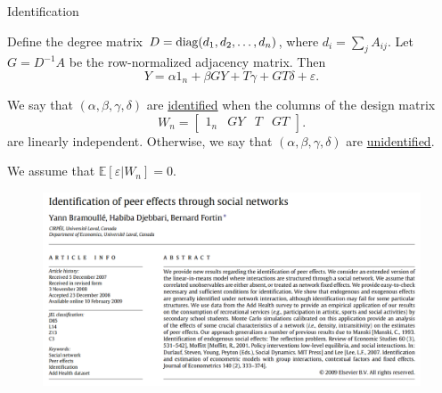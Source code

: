\documentclass[aspectratio=169]{beamer}
\theoremstyle{remark}
\begin{document}
\begin{frame}{Identification}
    
    Define the degree matrix $D = \operatorname*{diag}(d_1, d_2, \dots, d_n)$, where $d_i = \sum_j A_{ij}$. Let $G = D^{-1} A$ be the row-normalized adjacency matrix. Then
    \begin{equation*} \label{eq:lim-mv}
        Y = \alpha 1_n + \beta G Y + T \gamma + G T \delta + \varepsilon.
    \end{equation*}
    
    \begin{definition}
        We say that $(\alpha, \beta, \gamma, \delta)$ are \underline{identified} when the columns of the design matrix 
        \begin{equation*}
            \label{eq:design}
            W_n = \begin{bmatrix} 1_n & GY & T & GT \end{bmatrix}.
        \end{equation*}
        are linearly independent. Otherwise, we say that $(\alpha, \beta, \gamma, \delta)$ are \underline{unidentified}.
    \end{definition}
    
    We assume that $\mathbb E \left[\varepsilon | W_n \right] = 0$.
\end{frame}

\begin{frame}
    \begin{figure}
        \centering
        \includegraphics[width=\textwidth]{figures/bramoulle2009.png}
    \end{figure}
\end{frame}
\end{document}
